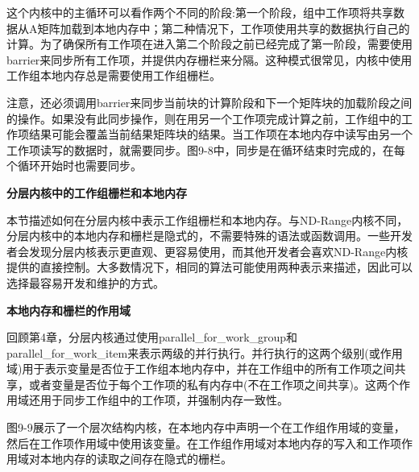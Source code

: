 这个内核中的主循环可以看作两个不同的阶段:第一个阶段，组中工作项将共享数据从A矩阵加载到本地内存中；第二种情况下，工作项使用共享的数据执行自己的计算。为了确保所有工作项在进入第二个阶段之前已经完成了第一阶段，需要使用barrier来同步所有工作项，并提供内存栅栏来分隔。这种模式很常见，内核中使用工作组本地内存总是需要使用工作组栅栏。\par

注意，还必须调用barrier来同步当前块的计算阶段和下一个矩阵块的加载阶段之间的操作。如果没有此同步操作，则在用另一个工作项完成计算之前，工作组中的工作项结果可能会覆盖当前结果矩阵块的结果。当工作项在本地内存中读写由另一个工作项读写的数据时，就需要同步。图9-8中，同步是在循环结束时完成的，在每个循环开始时也需要同步。\par

\hspace*{\fill} \par %
\textbf{分层内核中的工作组栅栏和本地内存}

本节描述如何在分层内核中表示工作组栅栏和本地内存。与ND-Range内核不同，分层内核中的本地内存和栅栏是隐式的，不需要特殊的语法或函数调用。一些开发者会发现分层内核表示更直观、更容易使用，而其他开发者会喜欢ND-Range内核提供的直接控制。大多数情况下，相同的算法可能使用两种表示来描述，因此可以选择最容易开发和维护的方式。\par

\hspace*{\fill} \par %
\textbf{本地内存和栅栏的作用域}

回顾第4章，分层内核通过使用parallel\_for\_work\_group和parallel\_for\_work\_item来表示两级的并行执行。并行执行的这两个级别(或作用域)用于表示变量是否位于工作组本地内存中，并在工作组中的所有工作项之间共享，或者变量是否位于每个工作项的私有内存中(不在工作项之间共享)。这两个作用域还用于同步工作组中的工作项，并强制内存一致性。\par

图9-9展示了一个层次结构内核，在本地内存中声明一个在工作组作用域的变量，然后在工作项作用域中使用该变量。在工作组作用域对本地内存的写入和工作项作用域对本地内存的读取之间存在隐式的栅栏。\par

